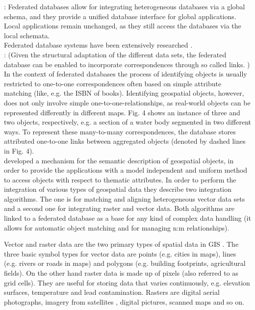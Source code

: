 \documentclass[12pt,a4paper]{report}
\newcommand{\acr}{\MakeUppercase}
\begin{document}
	\citep{Butenuth}: Federated databases allow for integrating heterogeneous databases via a global schema, and they provide a unified database interface for global applications. Local applications remain unchanged, as they still access the databases via the local schemata.
	\\

	Federated database systems have been extensively researched \citep{Litwin, Sheth}.
	\\

	\citep{Butenuth}: (Given the structural adaptation of the different data sets, the federated database can be enabled to incorporate correspondences through so called links. ) In the context of federated databases the process of identifying objects is usually restricted to one-to-one correspondences often based on simple attribute matching (like, e.g. the ISBN of books). Identifying geospatial objects, however, does not only involve simple one-to-one-relationships, as real-world objects can be represented differently in different maps. Fig. 4 shows an instance of three and two objects, respectively, e.g. a section of a water body segmented in two different ways. To represent these many-to-many correspondences, the database stores attributed one-to-one links between aggregated objects (denoted by dashed lines in Fig. 4).
	\\

	\citet{Butenuth} developed a mechanism for the semantic description of geospatial objects, in order to provide the applications with a model independent and uniform method to access objects with respect to thematic attributes. In order to perform the integration of various types of geospatial data they describe two integration algorithms. The one is for matching and aligning heterogeneous vector data sets and a second one for integrating raster and vector data. Both algorithms are linked to a federated database as a base for any kind of complex data handling (it allows for automatic object matching and for managing n:m relationships).
	\par
	Vector and raster data are the two primary types of spatial data in \acr{gis} \citep{gisGeography}. The three basic symbol types for vector data are points (e.g. cities in maps), lines (e.g. rivers or roads in maps) and polygons (e.g. building footprints, agricultural fields). On the other hand raster data is made up of pixels (also referred to as grid cells). They are useful for storing data that varies continuously, e.g. elevation surfaces, temperature and lead contamination. Rasters are digital aerial photographs, imagery from satellites \citep{Butenuth}, digital pictures, scanned maps and so on.
	\\
\end{document}
